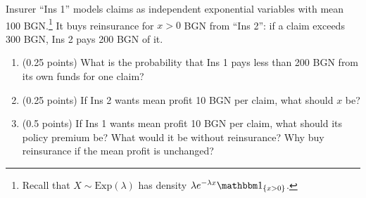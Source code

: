 \documentclass[a4paper]{report}
\begin{document}
\begin{problem}
Insurer ``Ins 1'' models claims as independent exponential variables with mean 100 BGN.\footnote{Recall that $X\sim\mathrm{Exp}(\lambda)$ has density $\lambda e^{-\lambda x}\mathbbm1_{\{x>0\}}$.} It buys reinsurance for $x>0$ BGN from ``Ins 2'': if a claim exceeds 300 BGN, Ins 2 pays 200 BGN of it.
\begin{enumerate}
\item (0.25 points) What is the probability that Ins 1 pays less than 200 BGN from its own funds for one claim?
\item (0.25 points) If Ins 2 wants mean profit 10 BGN per claim, what should $x$ be?
\item (0.5 points) If Ins 1 wants mean profit 10 BGN per claim, what should its policy premium be? What would it be without reinsurance? Why buy reinsurance if the mean profit is unchanged?
\end{enumerate}
\end{problem}
\end{document}
